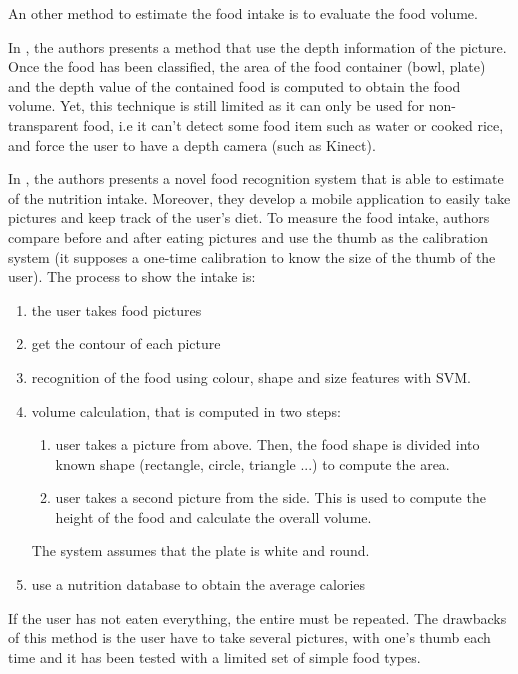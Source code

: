 
An other method to estimate the food intake is to evaluate the food volume.

In \cite{Chen2012}, the authors presents a method that use the depth information of the picture. Once the food has been classified, the area of the food container (bowl, plate) and the depth value of the contained food is computed to obtain the food volume.
Yet, this technique is still limited as it can only be used for non-transparent food, i.e it can't detect some food item such as water or cooked rice, and force the user to have a depth camera (such as Kinect).

In \cite{Almaghrabi2012a}, the authors presents a novel food recognition system that is able to estimate of the nutrition intake. Moreover, they develop a mobile application to easily take pictures and keep track of the user's diet.
To measure the food intake, authors compare before and after eating pictures and use the thumb as the calibration system (it supposes a one-time calibration to know the size of the thumb of the user).
The process to show the intake is:
\begin{enumerate}
    \item the user takes food pictures
    \item get the contour of each picture
    \item recognition of the food using colour, shape and size features with SVM.
    \item volume calculation, that is computed in two steps:
    \begin{enumerate}
        \item user takes a picture from above. Then, the food shape is divided into known shape (rectangle, circle, triangle ...) to compute the area.
        \item user takes a second picture from the side. This is used to compute the height of the food and calculate the overall volume.
    \end{enumerate}
    The system assumes that the plate is white and round.
    \item use a nutrition database to obtain the average calories
\end{enumerate}
If the user has not eaten everything, the entire must be repeated.
The drawbacks of this method is the user have to take several pictures, with one's thumb each time and it has been tested with a limited set of simple food types.


